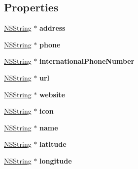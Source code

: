 \subsection*{\-Properties}
\begin{DoxyCompactItemize}
\item 
\hypertarget{interface_place_a832b0495b67e2346b5fba0aa14411614}{
\hyperlink{class_n_s_string}{\-N\-S\-String} $\ast$ {\bfseries address}}
\label{interface_place_a832b0495b67e2346b5fba0aa14411614}

\item 
\hypertarget{interface_place_a532b02a6b215477a915fa25c83f234e9}{
\hyperlink{class_n_s_string}{\-N\-S\-String} $\ast$ {\bfseries phone}}
\label{interface_place_a532b02a6b215477a915fa25c83f234e9}

\item 
\hypertarget{interface_place_a64a2dcf828339a43c48ef78899ba58ff}{
\hyperlink{class_n_s_string}{\-N\-S\-String} $\ast$ {\bfseries international\-Phone\-Number}}
\label{interface_place_a64a2dcf828339a43c48ef78899ba58ff}

\item 
\hypertarget{interface_place_a0f5159a6b5a5fbf452e34168ba5d47c7}{
\hyperlink{class_n_s_string}{\-N\-S\-String} $\ast$ {\bfseries url}}
\label{interface_place_a0f5159a6b5a5fbf452e34168ba5d47c7}

\item 
\hypertarget{interface_place_ae95d94e85f00267531f3c2e9f8fcb2e6}{
\hyperlink{class_n_s_string}{\-N\-S\-String} $\ast$ {\bfseries website}}
\label{interface_place_ae95d94e85f00267531f3c2e9f8fcb2e6}

\item 
\hypertarget{interface_place_ae5f037aae27648446210ea2cb169888e}{
\hyperlink{class_n_s_string}{\-N\-S\-String} $\ast$ {\bfseries icon}}
\label{interface_place_ae5f037aae27648446210ea2cb169888e}

\item 
\hypertarget{interface_place_af99652dd0d40e83f60290c882f5983b2}{
\hyperlink{class_n_s_string}{\-N\-S\-String} $\ast$ {\bfseries name}}
\label{interface_place_af99652dd0d40e83f60290c882f5983b2}

\item 
\hypertarget{interface_place_a3fa592e20c76add7e6740a0e4a39b5be}{
\hyperlink{class_n_s_string}{\-N\-S\-String} $\ast$ {\bfseries latitude}}
\label{interface_place_a3fa592e20c76add7e6740a0e4a39b5be}

\item 
\hypertarget{interface_place_a02f51bc8df25434f2618863412b886ea}{
\hyperlink{class_n_s_string}{\-N\-S\-String} $\ast$ {\bfseries longitude}}
\label{interface_place_a02f51bc8df25434f2618863412b886ea}


\end{DoxyCompactItemize}
